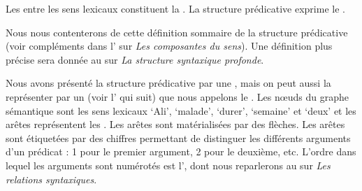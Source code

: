 \begin{styleLivreImportant}
Les  entre les sens lexicaux constituent la . La structure prédicative exprime le .
\end{styleLivreImportant}

Nous nous contenterons de cette définition sommaire de la structure prédicative (voir compléments dans l’ sur \textit{Les composantes du sens}). Une définition plus précise sera donnée au  sur \textit{La structure syntaxique profonde}.

Nous avons présenté la structure prédicative par une , mais on peut aussi la représenter par un  (voir l’ qui suit) que nous appelons le . Les nœuds du graphe sémantique sont les sens lexicaux ‘Ali’, ‘malade’, ‘durer’, ‘semaine’ et ‘deux’ et les arêtes représentent les . Les arêtes sont matérialisées par des flèches. Les arêtes sont étiquetées par des chiffres permettant de distinguer les différents arguments d’un prédicat : 1 pour le premier argument, 2 pour le deuxième, etc. L’ordre dans lequel les arguments sont numérotés est l’, dont nous reparlerons au  sur \textit{Les relations syntaxiques}.

\begin{figure}

\caption{\label{fig:Graphe sémantique}}

\end{figure}

